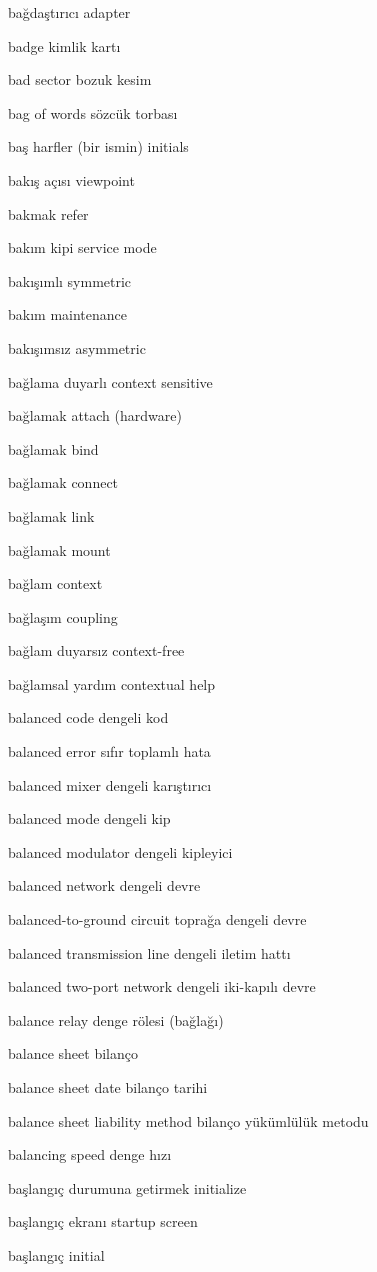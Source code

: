 \documentclass[12pt,fleqn]{article}\usepackage{../../common}
\begin{document}
bağdaştırıcı adapter

badge kimlik kartı

bad sector bozuk kesim

bag of words sözcük torbası

baş harfler (bir ismin) initials

bakış açısı viewpoint

bakmak refer

bakım kipi service mode

bakışımlı symmetric

bakım maintenance

bakışımsız asymmetric

bağlama duyarlı context sensitive

bağlamak attach (hardware)

bağlamak bind

bağlamak connect

bağlamak link

bağlamak mount

bağlam context

bağlaşım coupling

bağlam duyarsız context-free

bağlamsal yardım contextual help

balanced code dengeli kod

balanced error sıfır toplamlı hata

balanced mixer dengeli karıştırıcı

balanced mode dengeli kip

balanced modulator dengeli kipleyici

balanced network dengeli devre

balanced-to-ground circuit toprağa dengeli devre

balanced transmission line dengeli iletim hattı

balanced two-port network dengeli iki-kapılı devre

balance relay denge rölesi (bağlağı)

balance sheet bilanço

balance sheet date bilanço tarihi

balance sheet liability method bilanço yükümlülük metodu

balancing speed denge hızı

başlangıç durumuna getirmek initialize

başlangıç ekranı startup screen

başlangıç initial
\end{document}
